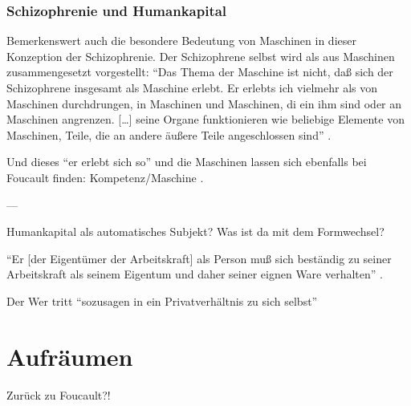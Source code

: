 \documentclass[12pt,
               DIV13,
               paper=a4,
               twoside=false,
               onehalfspacing,
               bibliography=totoc,
               toc=graduated,
               draft,
               ]{scrartcl}
\newcommand{\lips}{\dots\unkern}
\newcommand{\pc}[2]{\parencite[#1]{#2}}
\begin{document}
\subsubsection{Schizophrenie und Humankapital}

Bemerkenswert auch die besondere Bedeutung von Maschinen in dieser
Konzeption der Schizophrenie. Der Schizophrene selbst wird als aus
Maschinen zusammengesetzt vorgestellt: "`Das Thema der Maschine ist
nicht, daß sich der Schizophrene insgesamt als Maschine erlebt. Er
erlebts ich vielmehr als von Maschinen durchdrungen, in Maschinen und
Maschinen, di ein ihm sind oder an Maschinen angrenzen. [\lips] seine
Organe funktionieren wie beliebige Elemente von Maschinen, Teile, die
an andere äußere Teile angeschlossen sind"' \pc{18}{schizg}.

Und dieses "`er erlebt sich so"' und die Maschinen lassen sich
ebenfalls bei Foucault finden: Kompetenz/Maschine \pc{312+314}{gbp}.

---

Humankapital als automatisches Subjekt? Was ist da mit dem
Formwechsel?

"`Er [der Eigentümer der Arbeitskraft] als Person muß sich beständig
zu seiner Arbeitskraft als seinem Eigentum und daher seiner eignen
Ware verhalten"' \pc{182}{kap}.

Der Wer tritt "`sozusagen in ein Privatverhältnis zu sich selbst"'
\pc{169}{kap}


\section{Aufräumen}

Zurück zu Foucault?!


\newpage
\nocite{*}
\printshorthands
\printbibliography
\end{document}
